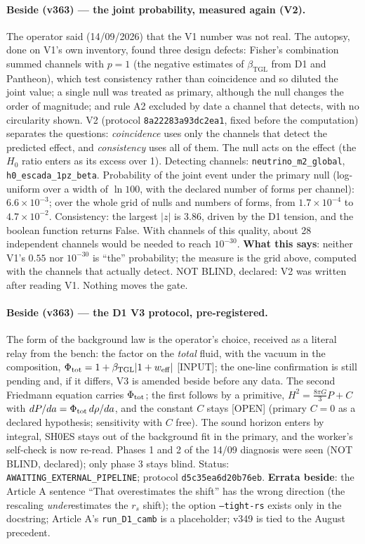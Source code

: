 \documentclass[11pt]{article}
\newcommand{\bTGL}{\beta_{\mathrm{TGL}}}\newcommand{\Msun}{M_{\odot}}\newcommand{\TGL}{\mathrm{TGL}}
\theoremstyle{definition}\newtheorem{deriv}{Derivation}
\begin{document}
\paragraph*{Beside (v363) --- the joint probability, measured again (V2).} The operator said (14/09/2026) that the V1 number was not real. The autopsy, done on V1's own inventory, found three design defects: Fisher's combination summed channels with $p=1$ (the negative estimates of $\bTGL$ from D1 and Pantheon), which test consistency rather than coincidence and so diluted the joint value; a single null was treated as primary, although the null changes the order of magnitude; and rule A2 excluded by date a channel that detects, with no circularity shown. V2 (protocol \texttt{8a22283a93dc2ea1}, fixed before the computation) separates the questions: \emph{coincidence} uses only the channels that detect the predicted effect, and \emph{consistency} uses all of them. The null acts on the effect (the $H_0$ ratio enters as its excess over 1). Detecting channels: \texttt{neutrino\_m2\_global}, \texttt{h0\_escada\_1pz\_beta}. Probability of the joint event under the primary null (log-uniform over a width of $\ln 100$, with the declared number of forms per channel): $6.6\times10^{-3}$; over the whole grid of nulls and numbers of forms, from $1.7\times10^{-4}$ to $4.7\times10^{-2}$. Consistency: the largest $|z|$ is 3.86, driven by the D1 tension, and the boolean function returns False. With channels of this quality, about 28 independent channels would be needed to reach $10^{-30}$. \textbf{What this says}: neither V1's $0.55$ nor $10^{-30}$ is ``the'' probability; the measure is the grid above, computed with the channels that actually detect. NOT BLIND, declared: V2 was written after reading V1. Nothing moves the gate.

\paragraph*{Beside (v363) --- the D1 V3 protocol, pre-registered.} The form of the background law is the operator's choice, received as a literal relay from the bench: the factor on the \emph{total} fluid, with the vacuum in the composition, $\Phi_{\rm tot}=1+\bTGL|1+w_{\rm eff}|$ [INPUT]; the one-line confirmation is still pending and, if it differs, V3 is amended beside before any data. The second Friedmann equation carries $\Phi_{\rm tot}$; the first follows by a primitive, $H^2=\tfrac{8\pi G}{3}P+C$ with $dP/da=\Phi_{\rm tot}\,d\rho/da$, and the constant $C$ stays [OPEN] (primary $C=0$ as a declared hypothesis; sensitivity with $C$ free). The sound horizon enters by integral, SH0ES stays out of the background fit in the primary, and the worker's self-check is now re-read. Phases 1 and 2 of the 14/09 diagnosis were seen (NOT BLIND, declared); only phase 3 stays blind. Status: \texttt{AWAITING\_EXTERNAL\_PIPELINE}; protocol \texttt{d5c35ea6d20b76eb}. \textbf{Errata beside}: the Article A sentence ``That overestimates the shift'' has the wrong direction (the rescaling \emph{under}estimates the $r_s$ shift); the option \texttt{--tight-rs} exists only in the docstring; Article A's \texttt{run\_D1\_camb} is a placeholder; v349 is tied to the August precedent.
\end{document}
